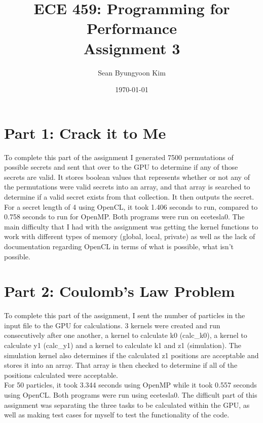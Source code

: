 \documentclass[12pt]{article}
\title{ECE 459: Programming for Performance\\Assignment 3}
\author{Sean Byungyoon Kim}
\date{\today}
\begin{document}
\maketitle

\section*{Part 1: Crack it to Me} 

To complete this part of the assignment I generated 7500 permutations of possible secrets and sent that over to the GPU to determine if any of those secrets are valid. It stores boolean values that represents whether or not any of the permutations were valid secrets into an array, and that array is searched to determine if a valid secret exists from that collection. It then outputs the secret. 
\\ 
For a secret length of 4 using OpenCL, it took 1.406 seconds to run, compared to 0.758 seconds to run for OpenMP. Both programs were run on ecetesla0. The main difficulty that I had with the assignment was getting the kernel functions to work with different types of memory (global, local, private) as well as the lack of documentation regarding OpenCL in terms of what is possible, what isn't possible. 

\section*{Part 2: Coulomb's Law Problem} 

To complete this part of the assignment, I sent the number of particles in the input file to the GPU for calculations. 3 kernels were created and run consecutively after one another, a kernel to calculate k0 (calc\_k0), a kernel to calculate y1 (calc\_y1) and a kernel to calculate k1 and z1 (simulation). The simulation kernel also determines if the calculated z1 positions are acceptable and stores it into an array. That array is then checked to determine if all of the positions calculated were acceptable. 
\\ 
For 50 particles, it took 3.344 seconds using OpenMP while it took 0.557 seconds using OpenCL. Both programs were run using ecetesla0. The difficult part of this assignment was separating the three tasks to be calculated within the GPU, as well as making test cases for myself to test the functionality of the code. 


\end{document}
